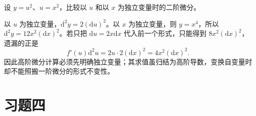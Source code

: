 \begin{example}
\label{ex:failure-of-invariance-second-differential}
设 $y=u^2$、$u=x^2$，比较以 $u$ 和以 $x$ 为独立变量时的二阶微分。
\end{example}
\begin{solve}
以 $u$ 为独立变量，$\mathrm d^2y=2(\mathrm du)^2$。以 $x$ 为独立变量，则 $y=x^4$，所以 $\mathrm d^2y=12x^2(\mathrm dx)^2$。若只把 $\mathrm du=2x\mathrm dx$ 代入前一个形式，只能得到 $8x^2(\mathrm dx)^2$，遗漏的正是
\[
    f'(u)\mathrm d^2u=2u\cdot2(\mathrm dx)^2
    =4x^2(\mathrm dx)^2.
\]
因此高阶微分计算必须先明确独立变量；其求值虽归结为高阶导数，变换自变量时却不能照搬一阶微分的形式不变性。
\end{solve}

\section*{习题四}
